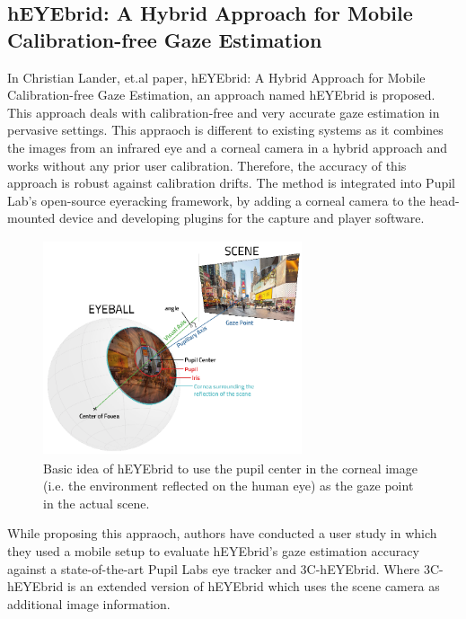 \subsection{hEYEbrid: A Hybrid Approach for Mobile Calibration-free Gaze Estimation}

In Christian Lander, et.al \cite{13} paper, hEYEbrid: A Hybrid Approach for Mobile Calibration-free Gaze Estimation, an approach named hEYEbrid is proposed. This approach deals with calibration-free and very accurate gaze estimation in pervasive settings. This appraoch is different to existing systems as it combines the images from an infrared eye and a corneal camera in a hybrid approach and works without any prior user calibration. Therefore, the accuracy of this approach is robust against calibration drifts. The method is integrated into Pupil Lab’s \cite{29} open-source eyeracking framework, by adding a corneal camera to the head-mounted device and developing plugins for the capture and player software.

\begin{figure}[!hbt]
  \centering
  \includegraphics[width=3in,height=2.5in]{lander1.png}
  \caption{Basic idea of hEYEbrid to use the pupil center in the corneal image (i.e. the environment reflected on the human eye) as the gaze point in the actual scene.}
  \label{lander1}
\end{figure}


While proposing this appraoch, authors have conducted a user study in which they used a mobile setup to evaluate hEYEbrid’s gaze estimation accuracy against a state-of-the-art Pupil Labs eye tracker and 3C-hEYEbrid. Where 3C-hEYEbrid is an extended version of hEYEbrid which uses the scene camera as additional image information.


